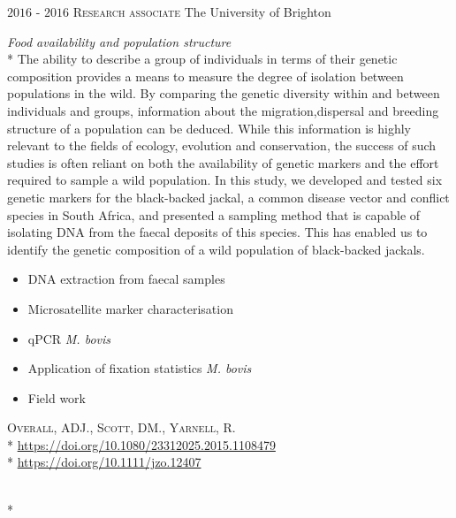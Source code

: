 \documentclass[hidelinks]{james-cv} %
\begin{document}
\begin{entrylist}
\entry
{$2016$ - $2016$}
{\textsc{Research associate}}
{The University of Brighton}
{\bodyfontsc\color{gray}{Population genetics: } \emph{Food availability and population structure}\\*
\color{gray}\normalsize\thinfont The ability to describe a group of individuals in terms of their genetic composition provides a means to measure the degree of isolation between populations in the wild. By comparing the genetic diversity within and between individuals and groups, information about the migration,dispersal and breeding structure of a population can be deduced. While this information is highly relevant to the fields of ecology, evolution and conservation, the success of such studies is often reliant on both the availability of genetic markers and the effort required to sample a wild population. In this study, we developed and tested six genetic markers for the black-backed jackal, a common disease vector and conflict species in South Africa, and presented a sampling method that is capable of isolating DNA from the faecal deposits of this species. This has enabled us to identify the genetic composition of a wild population of black-backed jackals.  
\color{gray}\normalsize\thinfont            
\begin{itemize}
\item DNA extraction from faecal samples
\item Microsatellite marker characterisation
\item qPCR \textit{M. bovis}
\item Application of fixation statistics \textit{M. bovis} 
\item Field work
\end{itemize}  
\bodyfontsc{}\textsc{Overall, ADJ., Scott, DM., Yarnell, R.}\\*
\bodyfontsc{}\thinfont\color{blue}\href{https://www.tandfonline.com/doi/full/10.1080/23312025.2015.1108479}{https://doi.org/10.1080/23312025.2015.1108479}\\*
\bodyfontsc\nolinebreak\color{gray}{DOI: }\thinfont\color{blue}\href{https://zslpublications.onlinelibrary.wiley.com/doi/abs/10.1111/jzo.12407}{https://doi.org/10.1111/jzo.12407}}\\*
\end{entrylist}

\end{document}
